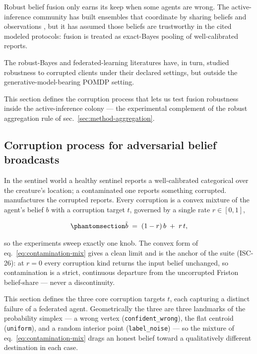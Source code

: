 \documentclass[
  english,
]{article}
\theoremstyle{plain}
\theoremstyle{definition}
\theoremstyle{remark}
\theoremstyle{definition}
\begin{document}
Robust belief fusion only earns its keep when some agents are wrong. The
active-inference community has built ensembles that coordinate by
sharing beliefs and observations
\citep{friston2024federated, heins2023collective, albarracin2022epistemic, kaufmann2021collective},
but it has assumed those beliefs are trustworthy in the cited modeled
protocols: fusion is treated as exact-Bayes pooling of well-calibrated
reports.

The robust-Bayes and federated-learning literatures
\citep{mcmahan2017communication, ashman2022partitioned, mildner2025fedgvi}
have, in turn, studied robustness to corrupted clients under their
declared settings, but outside the generative-model-bearing POMDP
setting.

This section defines the corruption process that lets us test fusion
robustness inside the active-inference colony --- the experimental
complement of the robust aggregation rule of
sec.~\ref{sec:method-aggregation}.

\subsection{Corruption process for adversarial belief
broadcasts}\label{sec:methods-corruption}

In the sentinel world a healthy sentinel reports a well-calibrated
categorical over the creature's location; a contaminated one reports
something corrupted.  manufactures the
corrupted reports. Every corruption is a convex mixture of the agent's
belief \(b\) with a corruption target \(t\), governed by a single rate
\(r \in [0, 1]\),

\begin{equation}\protect\phantomsection\label{eq:contamination-mix}{\tilde b \;=\; (1 - r)\, b \;+\; r\, t,}\end{equation}

so the experiments sweep exactly one knob. The convex form of
eq.~\ref{eq:contamination-mix} gives a clean limit and is the anchor of
the suite (ISC-26): at \(r = 0\) every corruption kind returns the input
belief unchanged, so contamination is a strict, continuous departure
from the uncorrupted Friston belief-share --- never a discontinuity.

This section defines the three core corruption targets \(t\), each
capturing a distinct failure of a federated agent. Geometrically the
three are three landmarks of the probability simplex --- a wrong vertex
(\texttt{confident\_wrong}), the flat centroid (\texttt{uniform}), and a
random interior point (\texttt{label\_noise}) --- so the mixture of
eq.~\ref{eq:contamination-mix} drags an honest belief toward a
qualitatively different destination in each case.
\end{document}
